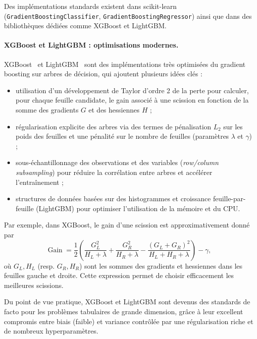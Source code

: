 Des implémentations standards existent dans scikit-learn (\texttt{GradientBoostingClassifier},
\texttt{GradientBoostingRegressor}) ainsi que dans des bibliothèques dédiées comme XGBoost et
LightGBM.

\paragraph{XGBoost et LightGBM : optimisations modernes.}
XGBoost~\cite{chen_guestrin_xgboost_2016} et LightGBM~\cite{ke_lightgbm_2017} sont des
implémentations très optimisées du gradient boosting sur arbres de décision, qui ajoutent
plusieurs idées clés :
\begin{itemize}
  \item utilisation d'un développement de Taylor d'ordre 2 de la perte pour calculer, pour chaque
  feuille candidate, le gain associé à une scission en fonction de la somme des gradients
  $G$ et des hessiennes $H$ ;

  \item régularisation explicite des arbres via des termes de pénalisation $L_2$ sur les poids des
  feuilles et une pénalité sur le nombre de feuilles (paramètres $\lambda$ et $\gamma$) ;

  \item sous-échantillonnage des observations et des variables (\emph{row/column subsampling})
  pour réduire la corrélation entre arbres et accélérer l'entraînement ;

  \item structures de données basées sur des histogrammes et croissance feuille-par-feuille
  (LightGBM) pour optimiser l'utilisation de la mémoire et du CPU.
\end{itemize}

Par exemple, dans XGBoost, le gain d'une scission est approximativement donné par
~\cite{chen_guestrin_xgboost_2016}
\[
  \operatorname{Gain}
  = \frac{1}{2}
    \left(
      \frac{G_L^2}{H_L + \lambda}
      + \frac{G_R^2}{H_R + \lambda}
      - \frac{(G_L + G_R)^2}{H_L + H_R + \lambda}
    \right)
    - \gamma,
\]
où $G_L, H_L$ (resp. $G_R, H_R$) sont les sommes des gradients et hessiennes dans les feuilles
gauche et droite. Cette expression permet de choisir efficacement les meilleures scissions.

Du point de vue pratique, XGBoost et LightGBM sont devenus des standards de facto pour les
problèmes tabulaires de grande dimension, grâce à leur excellent compromis entre biais (faible)
et variance contrôlée par une régularisation riche et de nombreux hyperparamètres.

